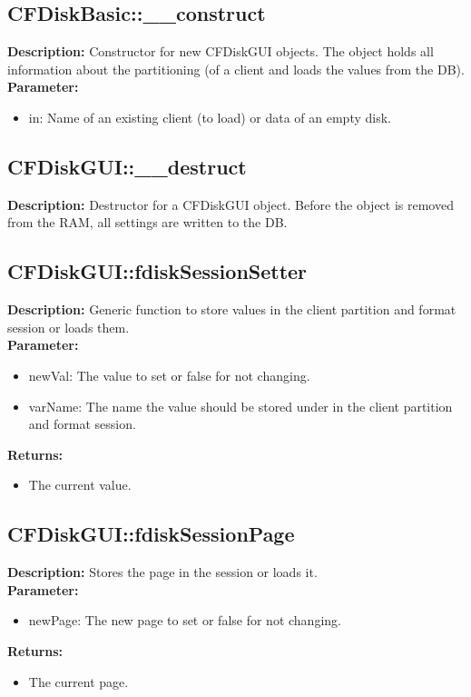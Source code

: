 \subsection{CFDiskBasic::\_\_construct}
\textbf{Description:} Constructor for new CFDiskGUI objects. The object holds all information about the partitioning (of a client and loads the values from the DB).\\
\textbf{Parameter:}
\begin{itemize}
\item in: Name of an existing client (to load) or data of an empty disk.
\end{itemize}

\subsection{CFDiskGUI::\_\_destruct}
\textbf{Description:} Destructor for a CFDiskGUI object. Before the object is removed from the RAM, all settings are written to the DB.\\

\subsection{CFDiskGUI::fdiskSessionSetter}
\textbf{Description:} Generic function to store values in the client partition and format session or loads them.\\
\textbf{Parameter:}
\begin{itemize}
\item newVal: The value to set or false for not changing.
\item varName: The name the value should be stored under in the client partition and format session.
\end{itemize}
\textbf{Returns:}
\begin{itemize}
\item The current value.
\end{itemize}

\subsection{CFDiskGUI::fdiskSessionPage}
\textbf{Description:} Stores the page in the session or loads it.\\
\textbf{Parameter:}
\begin{itemize}
\item newPage: The new page to set or false for not changing.
\end{itemize}
\textbf{Returns:}
\begin{itemize}
\item The current page.
\end{itemize}

